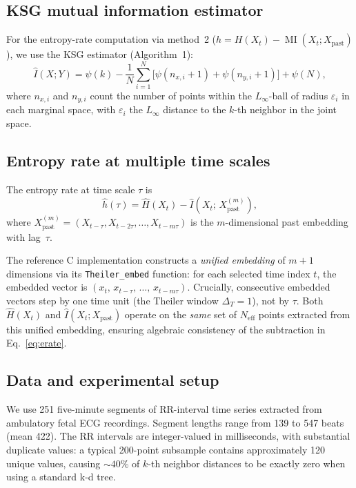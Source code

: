 \documentclass[12pt,a4paper]{article}
\newcommand{\Neff}{N_{\mathrm{eff}}}
\DeclareMathOperator{\MI}{MI}
\begin{document}
\subsection{KSG mutual information estimator}\label{sec:ksg}

For the entropy-rate computation via method~2 ($h = H(X_t) - \MI(X_t; X_{\mathrm{past}})$), we use the KSG estimator (Algorithm~1):
\begin{equation}\label{eq:ksg}
  \hat{I}(X; Y) = \psi(k) - \frac{1}{N} \sum_{i=1}^{N} \bigl[\psi(n_{x,i} + 1) + \psi(n_{y,i} + 1)\bigr] + \psi(N),
\end{equation}
where $n_{x,i}$ and $n_{y,i}$ count the number of points within the $L_\infty$-ball of radius $\varepsilon_i$ in each marginal space, with $\varepsilon_i$ the $L_\infty$ distance to the $k$-th neighbor in the joint space.

\subsection{Entropy rate at multiple time scales}\label{sec:erate}

The entropy rate at time scale $\tau$ is
\begin{equation}\label{eq:erate}
  \hat{h}(\tau) = \hat{H}(X_t) - \hat{I}(X_t;\, X_{\mathrm{past}}^{(m)}),
\end{equation}
where $X_{\mathrm{past}}^{(m)} = (X_{t-\tau}, X_{t-2\tau}, \ldots, X_{t-m\tau})$ is the $m$-dimensional past embedding with lag~$\tau$.

The reference C implementation constructs a \emph{unified embedding} of $m+1$ dimensions via its \texttt{Theiler\_embed} function:
for each selected time index $t$, the embedded vector is $(x_t,\, x_{t-\tau},\, \ldots,\, x_{t-m\tau})$.
Crucially, consecutive embedded vectors step by one time unit (the Theiler window $\Delta_T = 1$), not by $\tau$.
Both $\hat{H}(X_t)$ and $\hat{I}(X_t; X_{\mathrm{past}})$ operate on the \emph{same} set of $\Neff$ points extracted from this unified embedding, ensuring algebraic consistency of the subtraction in Eq.~\eqref{eq:erate}.

\subsection{Data and experimental setup}\label{sec:data}

We use 251 five-minute segments of RR-interval time series extracted from ambulatory fetal ECG recordings.
Segment lengths range from 139 to 547 beats (mean 422).
The RR intervals are integer-valued in milliseconds, with substantial duplicate values: a typical 200-point subsample contains approximately 120 unique values, causing ${\sim}40\%$ of $k$-th neighbor distances to be exactly zero when using a standard k-d tree.
\end{document}

